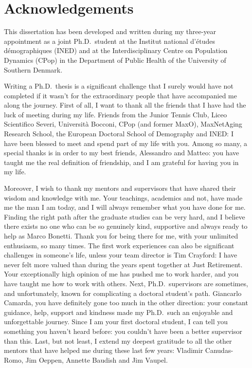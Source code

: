 \documentclass[Thesis]{subfiles}
\begin{document}
\newpage
\doublespacing
{}
\tableofcontents

\cleardoublepage

\chapter*{Acknowledgements}
This dissertation has been developed and written during my three-year appointment as a joint Ph.D.~student at the Institut national d'\'{e}tudes d\'emographiques (INED) and at the Interdisciplinary Centre on Population Dynamics (CPop) in the Department of Public Health of the University of Southern Denmark.

Writing a Ph.D.~thesis is a significant challenge that I surely would have not completed if it wasn't for the extraordinary people that have accompanied me along the journey. First of all, I want to thank all the friends that I have had the luck of meeting during my life. Friends from the Junior Tennis Club, Liceo Scientifico Severi, Universit\`{a} Bocconi, CPop (and former MaxO), MaxNetAging Research School, the European Doctoral School of Demography and INED: I have been blessed to meet and spend part of my life with you. Among so many, a special thanks is in order to my best friends, Alessandro and Matteo: you have taught me the real definition of friendship, and I am grateful for having you in my life.

Moreover, I wish to thank my mentors and supervisors that have shared their wisdom and knowledge with me. Your teachings, academics and not, have made me the man I am today, and I will always remember what you have done for me. Finding the right path after the graduate studies can be very hard, and I believe there exists no one who can be so genuinely kind, supportive and always ready to help as Marco Bonetti. Thank you for being there for me, with your unlimited enthusiasm, so many times. The first work experiences can also be significant challenges in someone's life, unless your team director is Tim Crayford: I have never felt more valued than during the years spent together at Just Retirement. Your exceptionally high opinion of me has pushed me to work harder, and you have taught me how to work with others. Next, Ph.D.~supervisors are sometimes, and unfortunately, known for complicating a doctoral student's path. Giancarlo Camarda, you have definitely gone too much in the other direction: your constant guidance, help, support and kindness made my Ph.D.~such an enjoyable and unforgettable journey. Since I am your first doctoral student, I can tell you something you haven't heard before: you couldn't have been a better supervisor than this. Last, but not least, I extend my deepest gratitude to all the other mentors that have helped me during these last few years: Vladimir Canudas-Romo, Jim Oeppen, Annette Baudish and Jim Vaupel.
\end{document}
